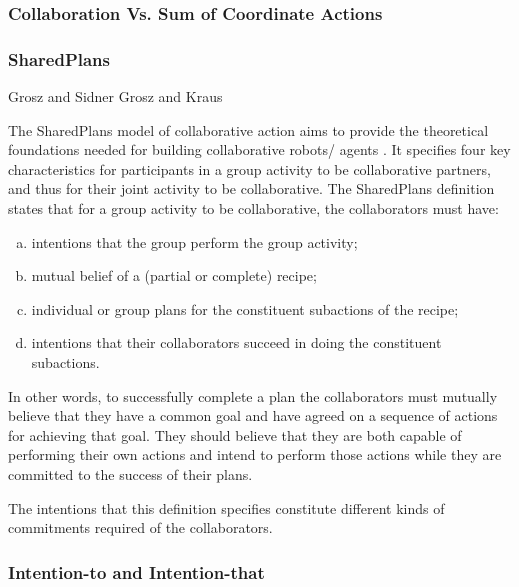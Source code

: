 \documentclass[11pt]{article}
\begin{document}
\subsubsection{Collaboration Vs. Sum of Coordinate Actions}

\cite{grosz:collaborative-systems}

\subsubsection{SharedPlans}

Grosz and Sidner \cite{grosz:plans-discourse}
Grosz and Kraus \cite{grosz:collaboration}

The SharedPlans model of collaborative action \cite{grosz:planning-acting}
\cite{grosz:collaboration} \cite{grosz:plans-discourse} aims to provide the
theoretical foundations needed for building collaborative robots/ agents
\cite{grosz:collaborative-systems}. It specifies four key characteristics for
participants in a group activity to be collaborative partners, and thus for
their joint activity to be collaborative. The SharedPlans definition states that
for a group activity to be collaborative, the collaborators must have:

\begin{enumerate}[a)]
  \item intentions that the group perform the group activity;
  \item mutual belief of a (partial or complete) recipe;
  \item individual or group plans for the constituent subactions of the recipe;
  \item intentions that their collaborators succeed in doing the constituent
  subactions.
\end{enumerate}
 
In other words, to successfully complete a plan the collaborators must mutually
believe that they have a common goal and have agreed on a sequence of actions
for achieving that goal. They should believe that they are both capable of
performing their own actions and intend to perform those actions while they are
committed to the success of their plans.

The intentions that this definition specifies constitute different kinds of
commitments required of the collaborators. 

\subsubsection{Intention-to and Intention-that}
\end{document}
